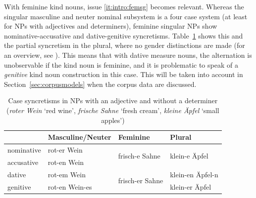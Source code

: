 \documentclass[USenglish]{article}
\begin{document}
\label{page:femininesyncretism}
With feminine kind nouns, issue \ref{it:intro:femsg} becomes relevant.
Whereas the singular masculine and neuter nominal subsystem is a four case system (at least for NPs with adjectives and determiners), feminine singular NPs show nominative-accusative and dative-genitive syncretisms.
Table~\ref{tab:syncretisms} shows this and the partial syncretism in the plural, where no gender distinctions are made (for an overview, see \citealp[XYZ]{Eisenberg2013a}).
This means that with dative measure nouns, the alternation is unobservable if the kind noun is feminine, and it is problematic to speak of a \textit{genitive} kind noun construction in this case.
This will be taken into account in Section~\ref{sec:corpusmodels} when the corpus data are discussed.

\begin{table}
  \centering
  \begin{tabular}{llll}
     & Masculine\slash Neuter & Feminine & Plural \\
     \midrule
     nominative & rot-er Wein    & \multirow{2}{*}{frisch-e Sahne}   & \multirow{2}{*}{klein-e Äpfel} \\
     accusative & rot-en Wein    &                                   &                                \\
     dative     & rot-em Wein    & \multirow{2}{*}{frisch-er Sahne}  & klein-en Äpfel-n               \\
     genitive   & rot-en Wein-es &                                   & klein-er Äpfel                 \\
  \end{tabular}
  \caption{Case syncretisms in NPs with an adjective and without a determiner (\textit{roter Wein} `red wine', \textit{frische Sahne} `fresh cream', \textit{kleine Äpfel} `small apples')}
  \label{tab:syncretisms}
\end{table}
\end{document}
